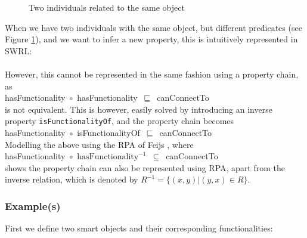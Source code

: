 \begin{figure}[bth]
	\caption{Two individuals related to the same object}
	\label{canConnectTo2}        
\end{figure}

When we have two individuals with the same object, but different predicates (see Figure \ref{canConnectTo2}), and we want to infer a new property, this is intuitively represented in \ac{SWRL}: \\

\\

However, this cannot be represented in the same fashion using a property chain, as\\ 

\noindent
hasFunctionality~\ensuremath{\circ}~hasFunctionality~\ensuremath{\sqsubseteq}~canConnectTo\\

is not equivalent. This is however, easily solved by introducing an inverse property \texttt{isFunctionalityOf}, and the property chain becomes\\

\noindent
hasFunctionality~\ensuremath{\circ}~isFunctionalityOf~\ensuremath{\sqsubseteq}~canConnectTo\\

Modelling the above using the \ac{RPA} of Feijs \cite{Feijs1999}, where\\
\label{RPA}
\noindent
hasFunctionality~\ensuremath{\circ}~$\text{hasFunctionality}^{-1}$~\ensuremath{\subseteq}~canConnectTo\\

shows the property chain can also be represented using \ac{RPA}, apart from the inverse relation, which is denoted by  $R^{-1} = \{ (x,y) | (y,x) \in R \}$.

\subsubsection{Example(s)}

First we define two smart objects and their corresponding functionalities:

